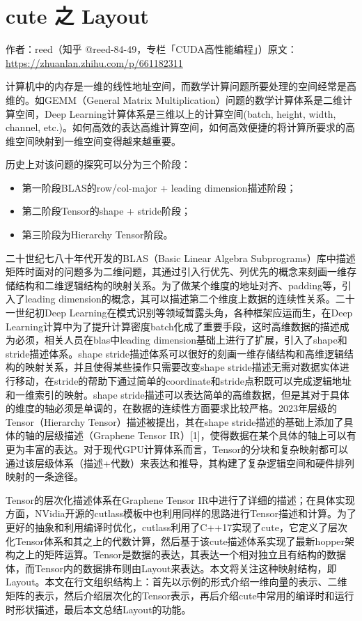 \chapter{cute 之 Layout}

\begin{center}\small 作者：reed（知乎 @reed-84-49，专栏「CUDA高性能编程」）\quad 原文：\url{https://zhuanlan.zhihu.com/p/661182311}\end{center}

计算机中的内存是一维的线性地址空间，而数学计算问题所要处理的空间经常是高维的。如GEMM（General Matrix Multiplication）问题的数学计算体系是二维计算空间，Deep Learning计算体系是三维以上的计算空间(batch, height, width, channel, etc.)。如何高效的表达高维计算空间，如何高效便捷的将计算所要求的高维空间映射到一维空间变得越来越重要。

历史上对该问题的探究可以分为三个阶段：

\begin{itemize}
  \item 第一阶段BLAS的row/col-major + leading dimension描述阶段；
  \item 第二阶段Tensor的shape + stride阶段；
  \item 第三阶段为Hierarchy Tensor阶段。
\end{itemize}

二十世纪七八十年代开发的BLAS（Basic Linear Algebra Subprograms）库中描述矩阵时面对的问题多为二维问题，其通过引入行优先、列优先的概念来刻画一维存储结构和二维逻辑结构的映射关系。为了做某个维度的地址对齐、padding等，引入了leading dimension的概念，其可以描述第二个维度上数据的连续性关系。二十一世纪初Deep Learning在模式识别等领域暂露头角，各种框架应运而生，在Deep Learning计算中为了提升计算密度batch化成了重要手段，这时高维数据的描述成为必须，相关人员在blas中leading dimension基础上进行了扩展，引入了shape和stride描述体系。shape stride描述体系可以很好的刻画一维存储结构和高维逻辑结构的映射关系，并且使得某些操作只需要改变shape stride描述无需对数据实体进行移动，在stride的帮助下通过简单的coordinate和stride点积既可以完成逻辑地址和一维索引的映射。shape stride描述可以表达简单的高维数据，但是其对于具体的维度的轴必须是单调的，在数据的连续性方面要求比较严格。2023年层级的Tensor（Hierarchy Tensor）描述被提出，其在shape stride描述的基础上添加了具体的轴的层级描述（Graphene Tensor IR）[1]，使得数据在某个具体的轴上可以有更为丰富的表达。对于现代GPU计算体系而言，Tensor的分块和复杂映射都可以通过该层级体系（描述+代数）来表达和推导，其构建了复杂逻辑空间和硬件排列映射的一条途径。

Tensor的层次化描述体系在Graphene Tensor IR中进行了详细的描述；在具体实现方面，NVidia开源的cutlass模板中也利用同样的思路进行Tensor描述和计算。为了更好的抽象和利用编译时优化，cutlass利用了C++17实现了cute，它定义了层次化Tensor体系和其之上的代数计算，然后基于该cute描述体系实现了最新hopper架构之上的矩阵运算。Tensor是数据的表达，其表达一个相对独立且有结构的数据体，而Tensor内的数据排布则由Layout来表达。本文将关注这种映射结构，即Layout。本文在行文组织结构上：首先以示例的形式介绍一维向量的表示、二维矩阵的表示，然后介绍层次化的Tensor表示，再后介绍cute中常用的编译时和运行时形状描述，最后本文总结Layout的功能。

